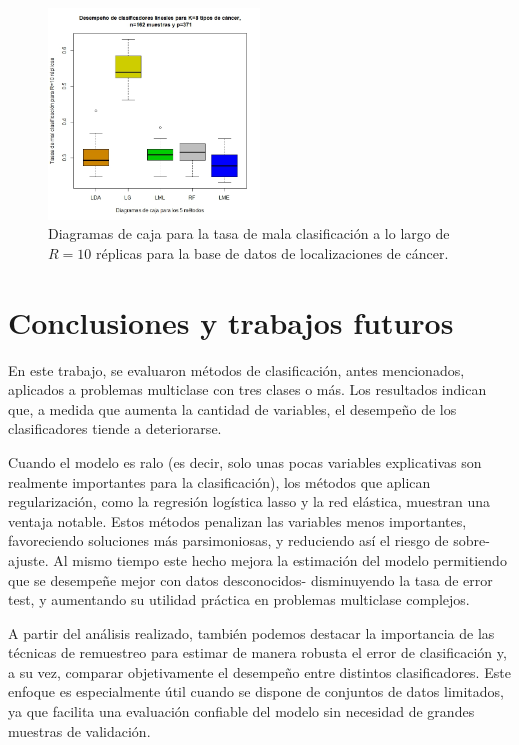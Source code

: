 \documentclass{report}
\begin{document}
 \begin{figure} [h]
 	\centering 
 	\includegraphics[width=0.5\textwidth]{boxplot_cancer_p130_R10}
 	\caption{ Diagramas de caja para la tasa de mala clasificación  a lo largo de $R=10$ réplicas para la base de datos de localizaciones de cáncer.}
 	\label{boxplot_cancer_p130_R10}
 \end{figure}
 
 \newpage
 


  \chapter{Conclusiones y trabajos futuros}\label{conclus}
  
 En este trabajo, se evaluaron  métodos de clasificación, antes mencionados, aplicados a problemas multiclase con tres clases o más. Los resultados indican que, a medida que aumenta la cantidad de variables, el desempeño de los clasificadores tiende a deteriorarse.

 Cuando el modelo es ralo (es decir, solo unas pocas variables explicativas son realmente importantes para la clasificación), los métodos que aplican regularización, como la regresión logística lasso y la red elástica, muestran una ventaja notable.
Estos métodos penalizan las variables menos importantes, favoreciendo soluciones más parsimoniosas, y reduciendo así el riesgo de sobre-ajuste. Al mismo tiempo este hecho  mejora la estimación del modelo permitiendo que se desempeñe mejor con datos desconocidos- disminuyendo la tasa de error test, y aumentando su utilidad práctica en problemas multiclase complejos. 


 A partir del análisis realizado, también podemos destacar la importancia de las técnicas de remuestreo para estimar de manera robusta el error de clasificación y, a su vez, comparar objetivamente el desempeño entre distintos clasificadores. Este enfoque es especialmente útil cuando se dispone de conjuntos de datos limitados, ya que facilita una evaluación confiable del modelo sin necesidad de grandes muestras de validación. 
\end{document}
